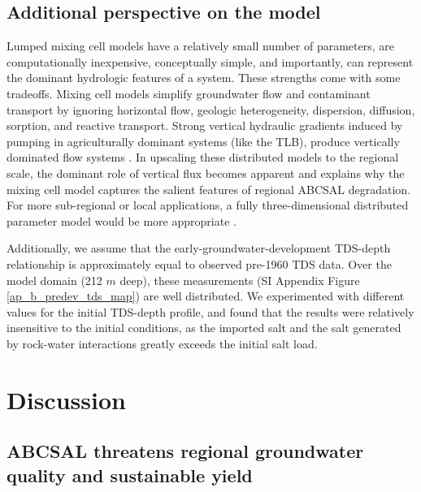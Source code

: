%
%

\subsection{Additional perspective on the model}
\label{ss_3_4}

Lumped mixing cell models have a relatively small number of parameters, are computationally inexpensive, conceptually simple, and importantly, can represent the dominant hydrologic features of a system. These strengths come with some tradeoffs. Mixing cell models simplify groundwater flow and contaminant transport by ignoring horizontal flow, geologic heterogeneity, dispersion, diffusion, sorption, and reactive transport. Strong vertical hydraulic gradients induced by pumping in agriculturally dominant systems (like the TLB), produce vertically dominated flow systems \citep{Brush2013, Faunted.2009}. In upscaling these distributed models to the regional scale, the dominant role of vertical flux becomes apparent and explains why the mixing cell model captures the salient features of regional ABCSAL degradation. For more sub-regional or local applications, a fully three-dimensional distributed parameter model would be more appropriate \citep{zhang2006nonpoint, guo2019upscaling, guo2019adaptive, henri2019}.

Additionally, we assume that the early-groundwater-development TDS-depth relationship is approximately equal to observed pre-1960 TDS data. Over the model domain (212 $m$ deep), these measurements (SI Appendix Figure \ref{ap_b_predev_tds_map}) are well distributed. We experimented with different values for the initial TDS-depth profile, and found that the results were relatively insensitive to the initial conditions, as the imported salt and the salt generated by rock-water interactions greatly exceeds the initial salt load. 



\section{Discussion}

%
%
\subsection{ABCSAL threatens regional groundwater quality and sustainable yield}
\label{ss_4_1}

